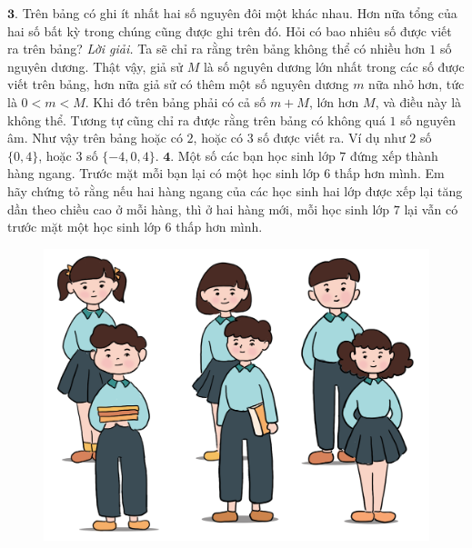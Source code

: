 \begin{multicols}{2}
\begin{figure}[H]
	\end{figure}
	$\pmb{3.}$	Trên bảng có ghi ít nhất hai số nguyên đôi một khác nhau. Hơn nữa tổng của hai số bất kỳ trong chúng cũng được ghi trên đó. Hỏi có bao nhiêu số được viết ra trên bảng?
	\vskip 0.1cm
	\textit{Lời giải.} 	Ta sẽ chỉ ra rằng trên bảng không thể có nhiều hơn $1$ số nguyên dương. Thật vậy, giả sử $M$ là số nguyên dương lớn nhất trong các số được viết trên bảng, hơn nữa giả sử có thêm một số nguyên dương $m$ nữa nhỏ hơn, tức là $0<m<M$. Khi đó trên bảng phải có cả số $m+M$, lớn hơn $M$, và điều này là không thể. Tương tự cũng chỉ ra được rằng trên bảng có không quá $1$ số nguyên âm. Như vậy trên bảng hoặc có $2$, hoặc có $3$ số được viết ra. Ví dụ như $2$ số $\{0, 4\}$, hoặc $3$ số $\{-4,0,4\}$.
	\vskip 0.1cm
	$\pmb{4.}$ Một số các bạn học sinh lớp $7$ đứng xếp thành hàng ngang. Trước mặt mỗi bạn lại có một học sinh lớp $6$ thấp hơn mình. Em hãy chứng tỏ rằng nếu hai hàng ngang của các học sinh hai lớp được xếp lại tăng dần theo chiều cao ở mỗi hàng, thì ở hai hàng mới, mỗi học sinh lớp $7$ lại vẫn có trước mặt một học sinh lớp $6$ thấp hơn mình.
	\begin{figure}[H]
		\vspace*{-5pt}
		\centering
		\captionsetup{labelformat= empty, justification=centering}
		\includegraphics[width= 1\linewidth]{b1}
		\vspace*{-15pt}

\end{figure}
\end{multicols}
